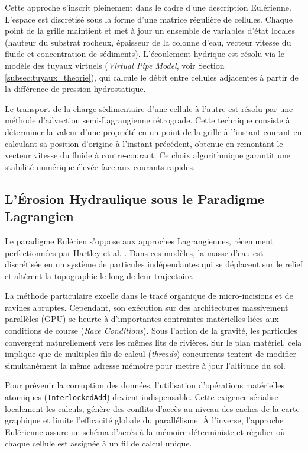 \documentclass[10pt,twocolumn,a4paper]{article}
\begin{document}
Cette approche s'inscrit pleinement dans le cadre d'une description Eulérienne. L'espace est discrétisé sous la forme d'une matrice régulière de cellules. Chaque point de la grille maintient et met à jour un ensemble de variables d'état locales (hauteur du substrat rocheux, épaisseur de la colonne d'eau, vecteur vitesse du fluide et concentration de sédiments). L'écoulement hydrique est résolu via le modèle des tuyaux virtuels (\textit{Virtual Pipe Model}, voir Section \ref{subsec:tuyaux_theorie}), qui calcule le débit entre cellules adjacentes à partir de la différence de pression hydrostatique.

Le transport de la charge sédimentaire d'une cellule à l'autre est résolu par une méthode d'advection semi-Lagrangienne rétrograde. Cette technique consiste à déterminer la valeur d'une propriété en un point de la grille à l'instant courant en calculant sa position d'origine à l'instant précédent, obtenue en remontant le vecteur vitesse du fluide à contre-courant. Ce choix algorithmique garantit une stabilité numérique élevée face aux courants rapides.

\subsection{L'Érosion Hydraulique sous le Paradigme Lagrangien}\label{subsec:lagrangien}
Le paradigme Eulérien s'oppose aux approches Lagrangiennes, récemment perfectionnées par Hartley et al. \cite{Hartley24}. Dans ces modèles, la masse d'eau est discrétisée en un système de particules indépendantes qui se déplacent sur le relief et altèrent la topographie le long de leur trajectoire.

La méthode particulaire excelle dans le tracé organique de micro-incisions et de ravines abruptes. Cependant, son exécution sur des architectures massivement parallèles (GPU) se heurte à d'importantes contraintes matérielles liées aux conditions de course (\textit{Race Conditions}). Sous l'action de la gravité, les particules convergent naturellement vers les mêmes lits de rivières. Sur le plan matériel, cela implique que de multiples fils de calcul (\textit{threads}) concurrents tentent de modifier simultanément la même adresse mémoire pour mettre à jour l'altitude du sol.

Pour prévenir la corruption des données, l'utilisation d'opérations matérielles atomiques (\texttt{InterlockedAdd}) devient indispensable. Cette exigence sérialise localement les calculs, génère des conflits d'accès au niveau des caches de la carte graphique et limite l'efficacité globale du parallélisme. À l'inverse, l'approche Eulérienne assure un schéma d'accès à la mémoire déterministe et régulier où chaque cellule est assignée à un fil de calcul unique.
\end{document}

